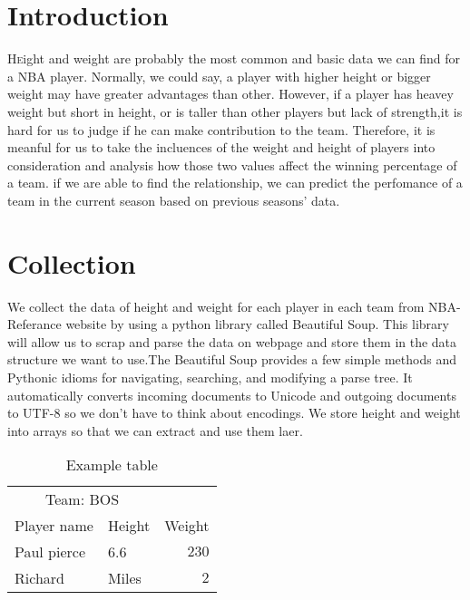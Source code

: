 \documentclass[twoside]{article}
\begin{document}
\begin{multicols}{2} %

\section{Introduction}

\lettrine[nindent=0em,lines=3]{H}eight and weight are probably the most common and basic data we can find for a NBA player. Normally, we could say, a player with higher height or bigger weight may have greater advantages than other. However, if a player has heavey weight but short in height, or is taller than other players but lack of strength,it is hard for us to judge if he can make contribution to the team. Therefore, it is meanful for us to take the incluences of the weight and height of players into consideration and analysis how those two values affect the winning percentage of a team. if we are able to find the relationship, we can predict the perfomance of a team in the current season based on previous seasons' data. 
 


\section{Collection}

We collect the data of height and weight for each player in each team from NBA-Referance website by using a python library called Beautiful Soup. This library will allow us to scrap and parse the data on webpage and store them in the data structure we want to use.The Beautiful Soup provides a few simple methods and Pythonic idioms for navigating, searching, and modifying a parse tree. It automatically converts incoming documents to Unicode and outgoing documents to UTF-8 so we don't have to think about encodings. We store height and weight into arrays so that we can extract and use them laer.

\begin{table}[H]
\caption{Example table}
\centering
\begin{tabular}{llr}
\toprule
\multicolumn{2}{c}{Team: BOS} \\
\cmidrule(r){1-2}
Player name & Height & Weight \\
\midrule
Paul pierce & 6.6 & $230$ \\
Richard & Miles & $2$ \\
\bottomrule
\end{tabular}
\end{table}


\end{multicols}
\end{document}
